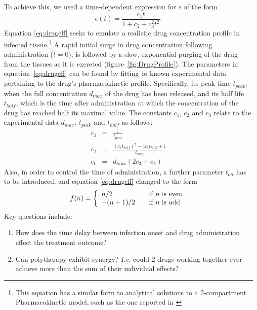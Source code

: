 \documentclass[a4paper, 12pt]{report}
\begin{document}
To achieve this, we used a time-dependent expression for $\epsilon$ of the form
\begin{equation}
\epsilon(t) = \frac{c_{1}t}{1 + c_{2}+c_{3}^{2}t^{2}}. \label{eq:drugeff}
\end{equation}
Equation \eqref{eq:drugeff} seeks to emulate a realistic drug concentration profile in infected tissue.\footnote{This equation has a similar form to analytical solutions to a 2-compartment Pharmacokinetic model, such as the one reported in \cite{}}
A rapid initial surge in drug concentration following administration ($t = 0$), is followed by a slow, exponential purging of the drug from the tissues as it is excreted (figure~\ref{fig:DrugProfile}). The parameters in equation~\ref{eq:drugeff} can be found by fitting to known experimental data pertaining to the drug's pharmacokinetic profile.
Specifically, its peak time $t_{peak}$, when the full concentration $d_{max}$ of the drug has been released, and its half life $t_{half}$, which is the time after administration at which the concentration of the drug has reached half its maximal value. The constants $c_1$, $c_2$ and $c_3$ relate to the experimental data $d_{max}$, $t_{peak}$ and $t_{half}$ as follows:
\begin{eqnarray}
c_3 &=& \frac{1}{t_{peak}}\\
c_2 &=& \frac{(c_3 t_{half})^2 - 4 c_3 t_{half} + 1}{t_{half}}\\
c_1 &=& d_{max} (2 c_3 + c_2)
\end{eqnarray}
Also, in order to control the time of administration, a further parameter $t_{on}$ has to be introduced, and equation \eqref{eq:drugeff} changed to the form
\begin{equation}
f(n) = \left\{ 
   \begin{array}{l l}
     n/2 & \quad \text{if $n$ is even}\\
     -(n+1)/2 & \quad \text{if $n$ is odd}
   \end{array} \right.
\end{equation}
Key questions include:
\begin{enumerate}
\item How does the time delay between infection onset and drug administration effect the treatment outcome?
\item Can polytherapy exhibit synergy? \textit{I.e.} could 2 drugs working together ever achieve more than the sum of their individual effects?
\end{enumerate}
\end{document}
